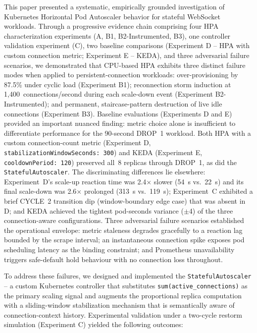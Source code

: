 \documentclass[twocolumn]{svjour3}
\begin{document}
This paper presented a systematic, empirically grounded investigation of Kubernetes Horizontal Pod Autoscaler behavior for stateful WebSocket workloads. Through a progressive evidence chain comprising four HPA characterization experiments (A, B1, B2-Instrumented, B3), one controller validation experiment (C), two baseline comparisons (Experiment D -- HPA with custom connection metric; Experiment E -- KEDA), and three adversarial failure scenarios, we demonstrated that CPU-based HPA exhibits three distinct failure modes when applied to persistent-connection workloads: over-provisioning by 87.5\% under cyclic load (Experiment B1); reconnection storm induction at 1,400~connections/second during each scale-down event (Experiment B2-Instrumented); and permanent, staircase-pattern destruction of live idle connections (Experiment B3). Baseline evaluations (Experiments D and E) provided an important nuanced finding: metric choice alone is insufficient to differentiate performance for the 90-second DROP~1 workload.  Both HPA with a custom connection-count metric (Experiment D, \texttt{stabilizationWindowSeconds:~300}) and KEDA (Experiment E, \texttt{cooldownPeriod:~120}) preserved all~8 replicas through DROP~1, as did the \texttt{StatefulAutoscaler}.  The discriminating differences lie elsewhere: Experiment~D's scale-up reaction time was 2.4$\times$ slower (54~s vs.~22~s) and its final scale-down was 2.6$\times$ prolonged (313~s vs.~119~s); Experiment~C exhibited a brief CYCLE~2 transition dip (window-boundary edge case) that was absent in D; and KEDA achieved the tightest pod-seconds variance ($\pm$4) of the three connection-aware configurations. Three adversarial failure scenarios established the operational envelope: metric staleness degrades gracefully to a reaction lag bounded by the scrape interval; an instantaneous connection spike exposes pod scheduling latency as the binding constraint; and Prometheus unavailability triggers safe-default hold behaviour with no connection loss throughout.

To address these failures, we designed and implemented the \texttt{StatefulAutoscaler} -- a custom Kubernetes controller that substitutes \texttt{sum(active\_connections)} as the primary scaling signal and augments the proportional replica computation with a sliding-window stabilization mechanism that is semantically aware of connection-context history. Experimental validation under a two-cycle restorm simulation (Experiment C) yielded the following outcomes:
\end{document}
